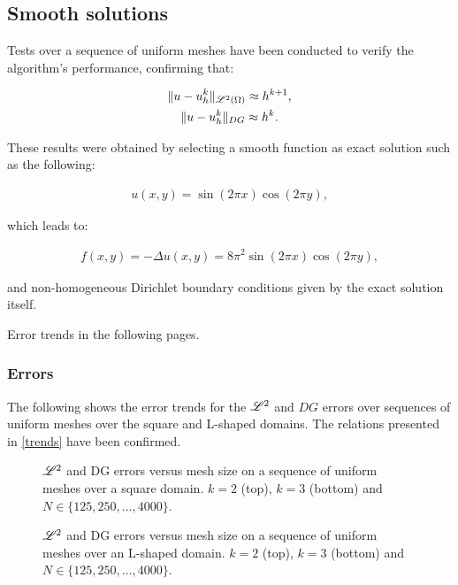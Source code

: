 \subsection{Smooth solutions}

Tests over a sequence of uniform meshes have been conducted to verify the algorithm's performance, confirming that:

\begin{gather} \label{trends}
    \lVert u - u^k_h \rVert_{\mathscr{L}^2(\Omega)} \approx h^{k + 1}, \\
    \lVert u - u^k_h \rVert_{DG} \approx h^k.
\end{gather}

These results were obtained by selecting a smooth function as exact solution such as the following:

\begin{gather}
    u(x, y) = \sin(2 \pi x) \cos(2 \pi y),
\end{gather}

which leads to:

\begin{gather}
    f(x, y) = -\Delta u(x, y) = 8 \pi^2 \sin(2 \pi x) \cos(2 \pi y),
\end{gather}

and non-homogeneous Dirichlet boundary conditions given by the exact solution itself.

Error trends in the following pages.

\newpage
\subsubsection{Errors}

The following shows the error trends for the $\mathscr{L}^2$ and $DG$ errors over sequences of uniform meshes over the square and L-shaped domains. The relations presented in \eqref{trends} have been confirmed.

\begin{figure}[!ht]
    
    
    \caption{$\mathscr{L}^2$ and DG errors versus mesh size on a sequence of uniform meshes over a square domain. $k = 2$ (top), $k = 3$ (bottom) and $N \in \{125, 250, \dots, 4000\}$.}
\end{figure}

\newpage
\begin{figure}[!ht]
    
    
    \caption{$\mathscr{L}^2$ and DG errors versus mesh size on a sequence of uniform meshes over an L-shaped domain. $k = 2$ (top), $k = 3$ (bottom) and $N \in \{125, 250, \dots, 4000\}$.}
\end{figure}

